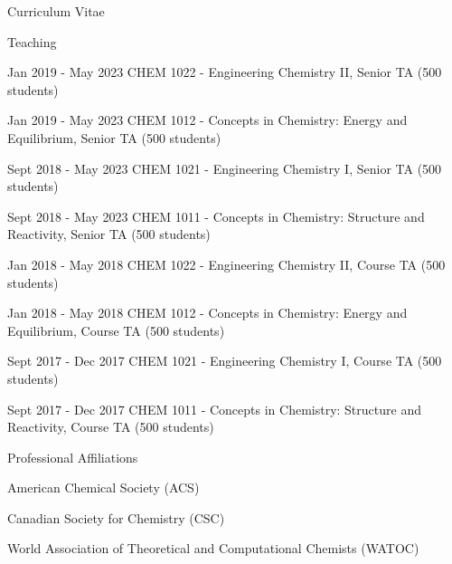 \documentclass[a4paper,oneside,11pt]{article}
\begin{document}
\begin{cv}{Curriculum Vitae}
\begin{cvlist}{Teaching}
     \item[Jan 2019 - May 2023] CHEM 1022 - Engineering Chemistry II, Senior TA (500 students)
    \item[Jan 2019 - May 2023] CHEM 1012 - Concepts in Chemistry: Energy and Equilibrium, Senior TA (500 students)
    \item[Sept 2018 - May 2023] CHEM 1021 - Engineering Chemistry I, Senior TA (500 students)
    \item[Sept 2018 - May 2023] CHEM 1011 - Concepts in Chemistry: Structure and Reactivity, Senior TA (500 students)

     \item[Jan 2018 - May 2018] CHEM 1022 - Engineering Chemistry II, Course TA (500 students)
    \item[Jan 2018 - May 2018] CHEM 1012 - Concepts in Chemistry: Energy and Equilibrium, Course TA (500 students)
    \item[Sept 2017 - Dec 2017] CHEM 1021 - Engineering Chemistry I, Course TA (500 students)
    \item[Sept 2017 - Dec 2017] CHEM 1011 - Concepts in Chemistry: Structure and Reactivity, Course TA (500 students)
    
  \end{cvlist}
    
\setlength{\cvlabelwidth}{0.5cm}
  \begin{cvlist}{Professional Affiliations}
    \item[] American Chemical Society (ACS)
    \item[] Canadian Society for Chemistry (CSC)
    \item[] World Association of Theoretical and Computational
    Chemists (WATOC)
  \end{cvlist}

  



\end{cv}
\end{document}
